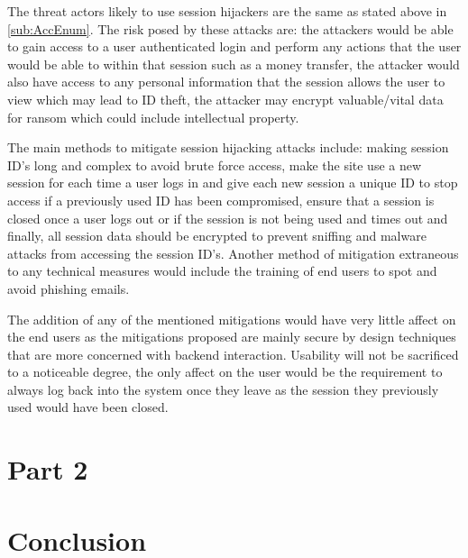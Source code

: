\documentclass{ueacmpstyle}
\begin{document}
        The threat actors likely to use session hijackers are the same as stated above 
        in \ref{sub:AccEnum}. The risk posed by these attacks are: the attackers would 
        be able to gain access to a user authenticated login and perform any actions that the 
        user would be able to within that session such as a money transfer, the attacker would 
        also have access to any personal information that the session allows the user to view 
        which may lead to ID theft, the attacker may encrypt valuable/vital data for ransom 
        which could include intellectual property.

        The main methods to mitigate session hijacking attacks include: making session ID's 
        long and complex to avoid brute force access, make the site use a new session for 
        each time a user logs in and give each new session a unique ID to stop access if a 
        previously used ID has been compromised, ensure that a session is closed once a user 
        logs out or if the session is not being used and times out and finally, all session 
        data should be encrypted to prevent sniffing and malware attacks from accessing the 
        session ID's. Another method of mitigation extraneous to any technical measures 
        would include the training of end users to spot and avoid phishing emails.

        The addition of any of the mentioned mitigations would have very little affect on 
        the end users as the mitigations proposed are mainly secure by design techniques 
        that are more concerned with backend interaction. Usability will not be sacrificed 
        to a noticeable degree, the only affect on the user would be the requirement to 
        always log back into the system once they leave as the session they previously used 
        would have been closed.
        
    \section{Part 2}\label{sec:Pt2}

    \section{Conclusion}\label{sec:Con}
    
    

	
	
	\newpage
	
\end{document}
